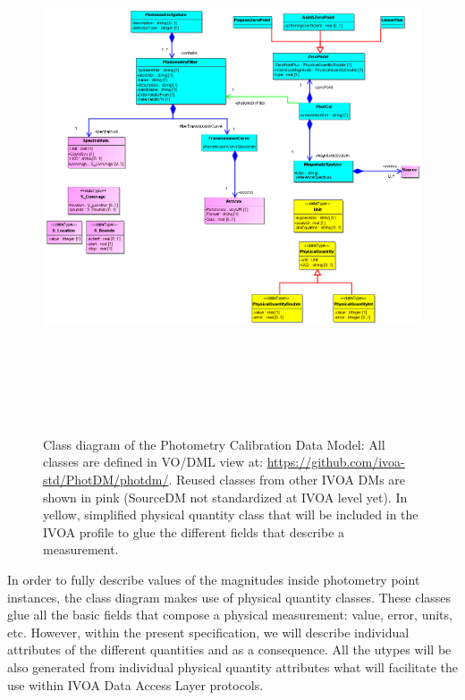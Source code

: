 \documentclass[11pt,a4paper]{ivoa}
\begin{document}

\begin{figure}[H]
\includegraphics[angle=90,width=5.98in,height=6.19in]{./media/PhotDM-UML.png}
\caption{Class diagram of the Photometry Calibration Data Model: All classes are defined in VO/DML view at: \url{https://github.com/ivoa-std/PhotDM/photdm/}. Reused classes from other IVOA DMs are shown in pink (SourceDM not standardized at IVOA level yet). In yellow, simplified physical quantity class that will be included in the IVOA profile to glue the different fields that describe a measurement.}
\end{figure}






\newpage


\newpage
In order to fully describe values of the magnitudes inside photometry point instances, the class diagram makes use of physical quantity classes. These classes glue all the basic fields that compose a physical measurement: value, error, units, etc. However, within the present specification, we will describe individual attributes of the different quantities and as a consequence. All the utypes will be also generated from individual physical quantity attributes what will facilitate the use within IVOA Data Access Layer protocols.
\par
\end{document}
